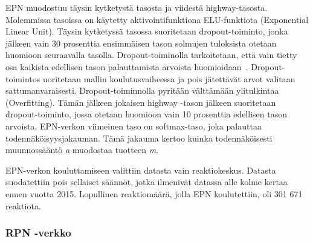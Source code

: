 \documentclass[finnish,twoside,censored,tkt,sw-line]{HYthesisML}
\begin{document}
EPN muodostuu täysin kytketystä tasosta ja viidestä highway-tasosta.
Molemmissa tasoissa on käytetty aktivointifunktiona ELU-funktiota (Exponential Linear Unit).
Täysin kytketyssä tasossa suoritetaan dropout-toiminto, jonka jälkeen vain 30 prosenttia ensimmäisen tason solmujen tuloksista otetaan huomioon seuraavalla tasolla.
Dropout-toiminolla tarkoitetaan, että vain tietty osa kaikista edellisen tason palauttamista arvoista huomioidaan~\cite{hinton2012improving}.
Dropout-toimintos uoritetaan mallin koulutusvaiheessa ja pois jätettävät arvot valitaan sattumanvaraisesti.
Dropout-toiminnolla pyritään välttämään ylitulkintaa (Overfitting).
Tämän jälkeen jokaisen highway -tason jälkeen suoritetaan dropout-toiminto, jossa otetaan huomioon vain 10 prosenttia edellisen tason arvoista.
EPN-verkon viimeinen taso on softmax-taso, joka palauttaa todennäköisyysjakauman.
Tämä jakauma kertoo kuinka todennäköisesti muunnossääntö \emph{a} muodostaa tuotteen \emph{m}.

EPN-verkon kouluttamiseen valittiin datasta vain reaktiokeskus.
Datasta suodatettiin pois sellaiset säännöt, jotka ilmenivät datassa alle kolme kertaa ennen vuotta 2015.
Lopullinen reaktiomäärä, jolla EPN koulutettiin, oli 301 671 reaktiota.

\subsubsection{RPN -verkko}
\end{document}
